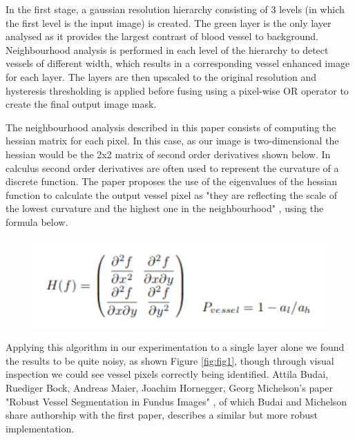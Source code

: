 \documentclass[conference]{IEEEtran}
\begin{document}
In the first stage, a gaussian resolution hierarchy consisting of 3 levels (in which the first level is the input image) is created. The green layer is the only layer analysed as it provides the largest contrast of blood vessel to background. Neighbourhood analysis is performed in each level of the hierarchy to detect vessels of different width, which results in a corresponding vessel enhanced image for each layer. The layers are then upscaled to the original resolution and hysteresis thresholding is applied before fusing using a pixel-wise OR operator to create the final output image mask.

\par
The neighbourhood analysis described in this paper consists of computing the hessian matrix for each pixel. In this case, as our image is two-dimensional the hessian would be the 2x2 matrix of second order derivatives shown below. In calculus second order derivatives are often used to represent the curvature of a discrete function. The paper proposes the use of the eigenvalues of the hessian function to calculate the output vessel pixel as "they are reflecting the scale of the lowest curvature and the highest one in the neighbourhood" \cite{21}, using the formula below.

\begin{figure}[H]
	\centering
	\includegraphics[width=\linewidth]{image/hes.PNG}
	\label{fig:hes}
\end{figure}

\par

Applying this algorithm in our experimentation to a single layer alone we found the results to be quite noisy, as shown Figure  \ref{fig:fig1}, though through visual inspection we could see vessel pixels correctly being identified. Attila Budai, Ruediger Bock, Andreas Maier, Joachim Hornegger, Georg Michelson's paper "Robust Vessel Segmentation in Fundus Images" \cite{22}, of which Budai and Michelson share authorship with the first paper, describes a similar but more robust implementation.
\end{document}
